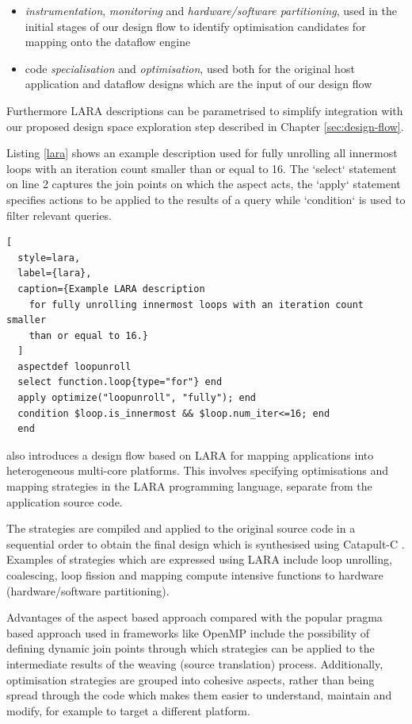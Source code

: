 \begin{itemize}
\item \emph{instrumentation}, \emph{monitoring} and
  \emph{hardware/software partitioning}, used in the initial stages of
  our design flow to identify optimisation candidates for mapping onto
  the dataflow engine

\item code \emph{specialisation} and \emph{optimisation}, used both
  for the original host application and dataflow designs which are the
  input of our design flow
\end{itemize}

Furthermore LARA descriptions can be parametrised to simplify
integration with our proposed design space exploration step described
in Chapter \ref{sec:design-flow}.

Listing \ref{lara} shows an example description used for fully
unrolling all innermost loops with an iteration count smaller than or
equal to 16. The `select` statement on line 2 captures the join points
on which the aspect acts, the `apply` statement specifies actions to
be applied to the results of a query while `condition` is used to
filter relevant queries.

\begin{lstlisting}[
  style=lara,
  label={lara},
  caption={Example LARA description
    for fully unrolling innermost loops with an iteration count smaller
    than or equal to 16.}
  ]
  aspectdef loopunroll
  select function.loop{type="for"} end
  apply optimize("loopunroll", "fully"); end
  condition $loop.is_innermost && $loop.num_iter<=16; end
  end
\end{lstlisting}

\cite{Cardoso:Carvalho:Teixeira:Diniz:Goncalves:Petrov:2012} also
introduces a design flow based on LARA for mapping applications into
heterogeneous multi-core platforms. This involves specifying
optimisations and mapping strategies in the LARA programming language,
separate from the application source code.

The strategies are compiled and applied to the original source code in
a sequential order to obtain the final design which is synthesised
using Catapult-C \cite{CatapultC}. Examples of strategies which are
expressed using LARA include loop unrolling, coalescing, loop fission
and mapping compute intensive functions to hardware (hardware/software
partitioning).

Advantages of the aspect based approach compared with the popular
pragma based approach used in frameworks like
OpenMP \cite{Ferrer:Judit:Bellens:Duran:Gonzalez:Marorell:Badia:Ayquade:Labarta:2011}
include the possibility of defining dynamic join points through which
strategies can be applied to the intermediate results of the weaving
(source translation) process. Additionally, optimisation strategies are
grouped into cohesive aspects, rather than being spread through the
code which makes them easier to understand, maintain and modify, for
example to target a different platform.


